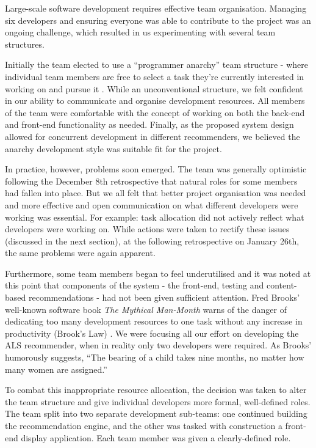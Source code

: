 \documentclass{l3proj}
\begin{document}
Large-scale software development requires effective team organisation. Managing six developers and ensuring everyone was able to contribute to the project was an ongoing challenge, which resulted in us experimenting with several team structures.

Initially the team elected to use a “programmer anarchy” team structure - where individual team members are free to select a task they’re currently interested in working on and pursue it \cite{ProgrammerAnarchy}. While an unconventional structure, we felt confident in our ability to communicate and organise development resources. All members of the team were comfortable with the concept of working on both the back-end and front-end functionality as needed. Finally, as the proposed system design allowed for concurrent development in different recommenders, we believed the anarchy development style was suitable fit for the project. 

In practice, however, problems soon emerged. The team was generally optimistic following the December 8th retrospective that natural roles for some members had fallen into place. But we all felt that better project organisation was needed and more effective and open communication on what different developers were working was essential. For example: task allocation did not actively reflect what developers were working on. While actions were taken to rectify these issues (discussed in the next section), at the following retrospective on January 26th, the same problems were again apparent. 

Furthermore, some team members began to feel underutilised and it was noted at this point that components of the system - the front-end, testing and content-based recommendations - had not been given sufficient attention. Fred Brooks' well-known software book \textit{The Mythical Man-Month} warns of the danger of dedicating too many development resources to one task without any increase in productivity (Brook’s Law) \cite{ManMonth}. We were focusing all our effort on developing the ALS recommender, when in reality only two developers were required. As Brooks’ humorously suggests, “The bearing of a child takes nine months, no matter how many women are assigned.”

To combat this inappropriate resource allocation, the decision was taken to alter the team structure and give individual developers more formal, well-defined roles. The team split into two separate development sub-teams: one continued building the recommendation engine, and the other was tasked with construction a front-end display application. Each team member was given a clearly-defined role. 
\end{document}
